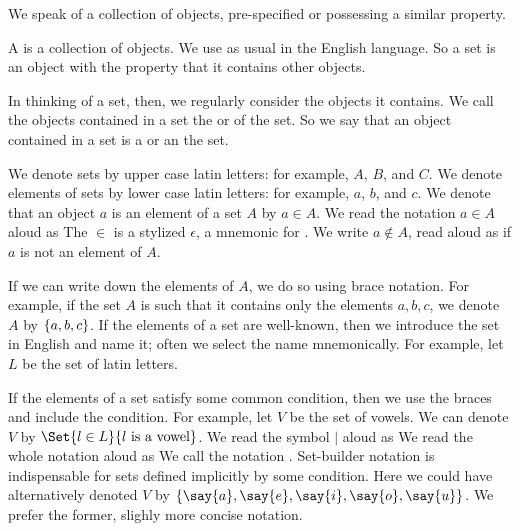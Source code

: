 
\sbasic



\sstart



We speak of a collection of objects,
pre-specified or possessing a
similar property.


A  is a collection
of objects.
We use  as
usual in the English language.
So a set is an object with
the property that it
contains other objects.

In thinking of a set, then,
we regularly consider the
objects it contains.
We call the objects contained
in a set the
 or
 of the set.
So we say that an object
contained in a set is a
 or an
 the set.


We denote sets by upper case
latin letters: for example,
$A$, $B$, and $C$.
We denote elements of sets
by lower case latin letters:
for example, $a$, $b$, and $c$.
We denote that an object $a$
is an element of a set $A$
by $a \in A$.
We read the notation
$a \in A$ aloud as 
The $\in$ is a stylized $\epsilon$,
a mnemonic for .
We write $a \not\in A$, read aloud
as  if $a$ is not
an element of $A$.

If we can write down the elements
of $A$, we do so using brace notation.
For example, if the set $A$ is such
that it contains only the elements
$a, b, c$, we denote $A$ by
$\{a, b, c\}$.
If the elements of a set are well-known,
then we introduce the set in English
and name it; often we select the name mnemonically.
For example, let $L$ be the set of latin letters.

If the elements of a set satisfy
some common condition, then we use
the braces and include the condition.
For example, let $V$ be the set of
vowels.
We can denote $V$ by
$\Set{l \in L}{l \text{ is a vowel}}$.
We read the symbol $\mid$ aloud as
We read the whole notation aloud as
We call the notation
.
Set-builder notation is indispensable for
sets defined implicitly by some condition.
Here we could have alternatively denoted
$V$ by
$\set{\say{a},\say{e},\say{i},\say{o},\say{u}}$.
We prefer the former, slighly more concise notation.

